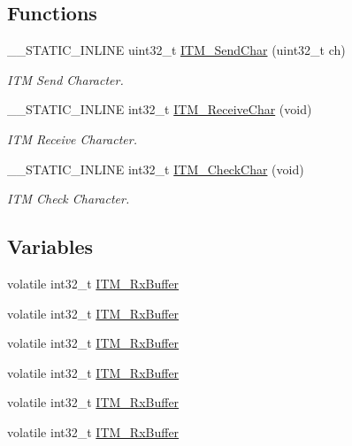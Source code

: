 \subsection*{Functions}
\begin{DoxyCompactItemize}
\item 
\+\_\+\+\_\+\+S\+T\+A\+T\+I\+C\+\_\+\+I\+N\+L\+I\+NE uint32\+\_\+t \mbox{\hyperlink{group___c_m_s_i_s__core___debug_functions_gac90a497bd64286b84552c2c553d3419e}{I\+T\+M\+\_\+\+Send\+Char}} (uint32\+\_\+t ch)
\begin{DoxyCompactList}\small\item\em I\+TM Send Character. \end{DoxyCompactList}\item 
\+\_\+\+\_\+\+S\+T\+A\+T\+I\+C\+\_\+\+I\+N\+L\+I\+NE int32\+\_\+t \mbox{\hyperlink{group___c_m_s_i_s__core___debug_functions_gac3ee2c30a1ac4ed34c8a866a17decd53}{I\+T\+M\+\_\+\+Receive\+Char}} (void)
\begin{DoxyCompactList}\small\item\em I\+TM Receive Character. \end{DoxyCompactList}\item 
\+\_\+\+\_\+\+S\+T\+A\+T\+I\+C\+\_\+\+I\+N\+L\+I\+NE int32\+\_\+t \mbox{\hyperlink{group___c_m_s_i_s__core___debug_functions_gae61ce9ca5917735325cd93b0fb21dd29}{I\+T\+M\+\_\+\+Check\+Char}} (void)
\begin{DoxyCompactList}\small\item\em I\+TM Check Character. \end{DoxyCompactList}\end{DoxyCompactItemize}
\subsection*{Variables}
\begin{DoxyCompactItemize}
\item 
volatile int32\+\_\+t \mbox{\hyperlink{group___c_m_s_i_s__core___debug_functions_ga12e68e55a7badc271b948d6c7230b2a8}{I\+T\+M\+\_\+\+Rx\+Buffer}}
\item 
volatile int32\+\_\+t \mbox{\hyperlink{group___c_m_s_i_s__core___debug_functions_ga12e68e55a7badc271b948d6c7230b2a8}{I\+T\+M\+\_\+\+Rx\+Buffer}}
\item 
volatile int32\+\_\+t \mbox{\hyperlink{group___c_m_s_i_s__core___debug_functions_ga12e68e55a7badc271b948d6c7230b2a8}{I\+T\+M\+\_\+\+Rx\+Buffer}}
\item 
volatile int32\+\_\+t \mbox{\hyperlink{group___c_m_s_i_s__core___debug_functions_ga12e68e55a7badc271b948d6c7230b2a8}{I\+T\+M\+\_\+\+Rx\+Buffer}}
\item 
volatile int32\+\_\+t \mbox{\hyperlink{group___c_m_s_i_s__core___debug_functions_ga12e68e55a7badc271b948d6c7230b2a8}{I\+T\+M\+\_\+\+Rx\+Buffer}}
\item 
volatile int32\+\_\+t \mbox{\hyperlink{group___c_m_s_i_s__core___debug_functions_ga12e68e55a7badc271b948d6c7230b2a8}{I\+T\+M\+\_\+\+Rx\+Buffer}}
\end{DoxyCompactItemize}


